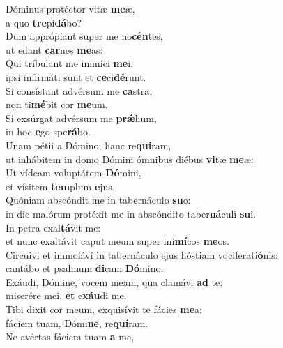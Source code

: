 \evenverse Dóminus protéctor vitæ \textbf{me}æ,~\*\\
\evenverse a quo \textbf{tre}pi\textbf{dá}bo?\\
\oddverse Dum apprópiant super me no\textbf{cén}tes,~\*\\
\oddverse ut edant \textbf{car}nes \textbf{me}as:\\
\evenverse Qui tríbulant me inimíci \textbf{me}i,~\*\\
\evenverse ipsi infirmáti sunt et \textbf{ce}ci\textbf{dé}runt.\\
\oddverse Si consístant advérsum me \textbf{ca}stra,~\*\\
\oddverse non ti\textbf{mé}bit cor \textbf{me}um.\\
\evenverse Si exsúrgat advérsum me \textbf{prǽ}lium,~\*\\
\evenverse in hoc \textbf{e}go spe\textbf{rá}bo.\\
\oddverse Unam pétii a Dómino, hanc re\textbf{quí}ram,~\*\\
\oddverse ut inhábitem in domo Dómini ómnibus diébus \textbf{vi}tæ \textbf{me}æ:\\
\evenverse Ut vídeam voluptátem \textbf{Dó}mini,~\*\\
\evenverse et vísitem \textbf{tem}plum \textbf{e}jus.\\
\oddverse Quóniam abscóndit me in tabernáculo \textbf{su}o:~\*\\
\oddverse in die malórum protéxit me in abscóndito taber\textbf{ná}culi \textbf{su}i.\\
\evenverse In petra exal\textbf{tá}vit me:~\*\\
\evenverse et nunc exaltávit caput meum super ini\textbf{mí}cos \textbf{me}os.\\
\oddverse Circuívi et immolávi in tabernáculo ejus hóstiam vociferati\textbf{ó}nis:~\*\\
\oddverse cantábo et psalmum \textbf{di}cam \textbf{Dó}mino.\\
\evenverse Exáudi, Dómine, vocem meam, qua clamávi \textbf{ad} te:~\*\\
\evenverse miserére mei, \textbf{et} e\textbf{xáu}di me.\\
\oddverse Tibi dixit cor meum, exquisívit te fácies \textbf{me}a:~\*\\
\oddverse fáciem tuam, Dómi\textbf{ne}, re\textbf{quí}ram.\\
\evenverse Ne avértas fáciem tuam \textbf{a} me,~\*\\
